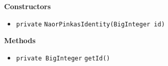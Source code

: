 \textbf{\sffamily Constructors}
\begin{itemize}
\item \lstinline|private| \lstinline|NaorPinkasIdentity|\lstinline|(BigInteger id)| \\[-0.6em]




\end{itemize}


\textbf{\sffamily Methods}
\begin{itemize}
\item \lstinline|private BigInteger| \lstinline|getId|\lstinline|()| \\[-0.6em]




\end{itemize}


